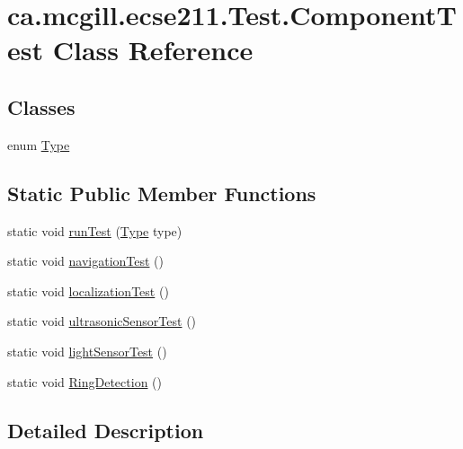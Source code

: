 \hypertarget{classca_1_1mcgill_1_1ecse211_1_1_test_1_1_component_test}{}\section{ca.\+mcgill.\+ecse211.\+Test.\+Component\+Test Class Reference}
\label{classca_1_1mcgill_1_1ecse211_1_1_test_1_1_component_test}
\subsection*{Classes}
\begin{DoxyCompactItemize}
\item 
enum \hyperlink{enumca_1_1mcgill_1_1ecse211_1_1_test_1_1_component_test_1_1_type}{Type}
\end{DoxyCompactItemize}
\subsection*{Static Public Member Functions}
\begin{DoxyCompactItemize}
\item 
static void \hyperlink{classca_1_1mcgill_1_1ecse211_1_1_test_1_1_component_test_a2e7169881d709c5cc7a85b064651abda}{run\+Test} (\hyperlink{enumca_1_1mcgill_1_1ecse211_1_1_test_1_1_component_test_1_1_type}{Type} type)
\item 
static void \hyperlink{classca_1_1mcgill_1_1ecse211_1_1_test_1_1_component_test_a1a47d24fa18b0e254a35ed95ad3f8a09}{navigation\+Test} ()
\item 
static void \hyperlink{classca_1_1mcgill_1_1ecse211_1_1_test_1_1_component_test_a75984b019b30626003d0b2a9c5a52e75}{localization\+Test} ()
\item 
static void \hyperlink{classca_1_1mcgill_1_1ecse211_1_1_test_1_1_component_test_a2ef053a823fdbf349c1eaa3ae11bd477}{ultrasonic\+Sensor\+Test} ()
\item 
static void \hyperlink{classca_1_1mcgill_1_1ecse211_1_1_test_1_1_component_test_aafdb1b5fb1ecccae51c551f54f92c447}{light\+Sensor\+Test} ()
\item 
static void \hyperlink{classca_1_1mcgill_1_1ecse211_1_1_test_1_1_component_test_a8e356dc648d4b446fc6f7b0987078c2d}{Ring\+Detection} ()
\end{DoxyCompactItemize}


\subsection{Detailed Description}


